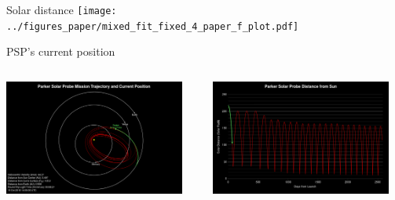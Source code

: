\begin{frame}[plain,c]{Solar distance}{}
	\centering
	\texttt{[image: ../figures\_paper/mixed\_fit\_fixed\_4\_paper\_f\_plot.pdf]}
\end{frame}

\begin{frame}[plain,c]{PSP's current position}{}
	\begin{columns}[t]	%
	
		\hspace*{-22pt}
		\includegraphics[height=0.9\textwidth]{../talk_figures/psp201810_0400_top.png}

	
		\hspace*{-10pt}
		\includegraphics[height=0.9\textwidth]{../talk_figures/psp201810_0400_bottom.png}
		

\end{columns}
\end{frame}
